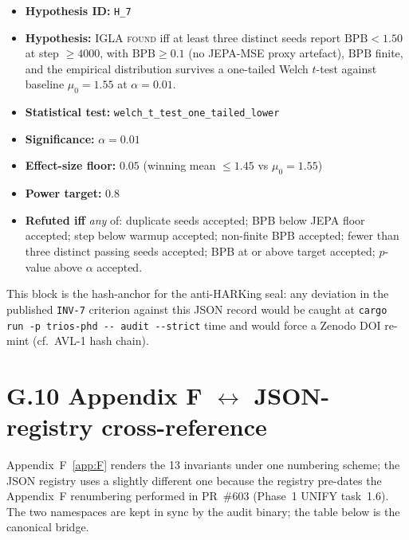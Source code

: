 \begin{itemize}\setlength\itemsep{0.1em}
  \item \textbf{Hypothesis ID:} \texttt{H\_7}
  \item \textbf{Hypothesis:} IGLA \textsc{found} iff at least three distinct
    seeds report $\mathrm{BPB} < 1.50$ at step $\geq 4000$, with $\mathrm{BPB} \geq 0.1$
    (no JEPA-MSE proxy artefact), $\mathrm{BPB}$ finite, and the empirical
    distribution survives a one-tailed Welch $t$-test against baseline
    $\mu_0 = 1.55$ at $\alpha = 0.01$.
  \item \textbf{Statistical test:} \texttt{welch\_t\_test\_one\_tailed\_lower}
  \item \textbf{Significance:} $\alpha = 0.01$
  \item \textbf{Effect-size floor:} $0.05$ (winning mean $\leq 1.45$ vs $\mu_0 = 1.55$)
  \item \textbf{Power target:} $0.8$
  \item \textbf{Refuted iff} \emph{any} of: duplicate seeds accepted; BPB
    below JEPA floor accepted; step below warmup accepted; non-finite
    BPB accepted; fewer than three distinct passing seeds accepted; BPB at
    or above target accepted; $p$-value above $\alpha$ accepted.
\end{itemize}

This block is the hash-anchor for the anti-HARKing seal: any deviation in
the published \texttt{INV-7} criterion against this JSON record would be
caught at \texttt{cargo run -p trios-phd -{}-{} audit -{}-{}strict} time and would
force a Zenodo DOI re-mint (cf.\ AVL-1 hash chain).

\section*{G.10 Appendix F $\leftrightarrow$ JSON-registry cross-reference}

\noindent Appendix~F~\ref{app:F} renders the 13 invariants
under one numbering scheme; the JSON registry uses a slightly different one
because the registry pre-dates the Appendix~F renumbering performed in
PR~\#603 (Phase~1 UNIFY task~1.6). The two namespaces are kept in sync by
the audit binary; the table below is the canonical bridge.

